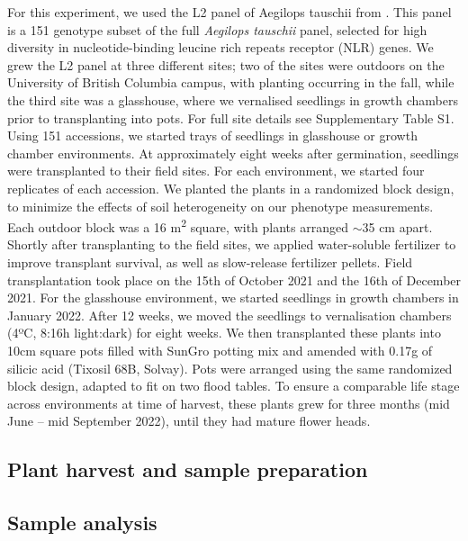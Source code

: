 \documentclass[12pt, letterpaper, ]{report}
\begin{document}
For this experiment, we used the L2 panel of Aegilops tauschii from \textcite{gaurav_population_2022}. This panel is a 151 genotype subset of the full \textit{Aegilops tauschii} panel, selected for high diversity in nucleotide-binding leucine rich repeats receptor (NLR) genes. We grew the L2 panel at three different sites; two of the sites were outdoors on the University of British Columbia campus, with planting occurring in the fall, while the third site was a glasshouse, where we vernalised seedlings in growth chambers prior to transplanting into pots. For full site details see Supplementary Table S1. Using 151 accessions, we started trays of seedlings in glasshouse or growth chamber environments. At approximately eight weeks after germination, seedlings were transplanted to their field sites. For each environment, we started four replicates of each accession. We planted the plants in a randomized block design, to minimize the effects of soil heterogeneity on our phenotype measurements. Each outdoor block was a 16 m\textsuperscript{2} square, with plants arranged $\sim$35 cm apart. Shortly after transplanting to the field sites, we applied water-soluble fertilizer to improve transplant survival, as well as slow-release fertilizer pellets. Field transplantation took place on the 15th of October 2021 and the 16th of December 2021. For the glasshouse environment, we started seedlings in growth chambers in January 2022. After 12 weeks, we moved the seedlings to vernalisation chambers (4ºC, 8:16h light:dark) for eight weeks. We then transplanted these plants into 10cm square pots filled with SunGro potting mix and amended with 0.17g of silicic acid (Tixosil 68B, Solvay). Pots were arranged using the same randomized block design, adapted to fit on two flood tables. To ensure a comparable life stage across environments at time of harvest, these plants grew for three months (mid June – mid September 2022), until they had mature flower heads. 

\subsection{Plant harvest and sample preparation}

  

\subsection{Sample analysis}
\end{document}
